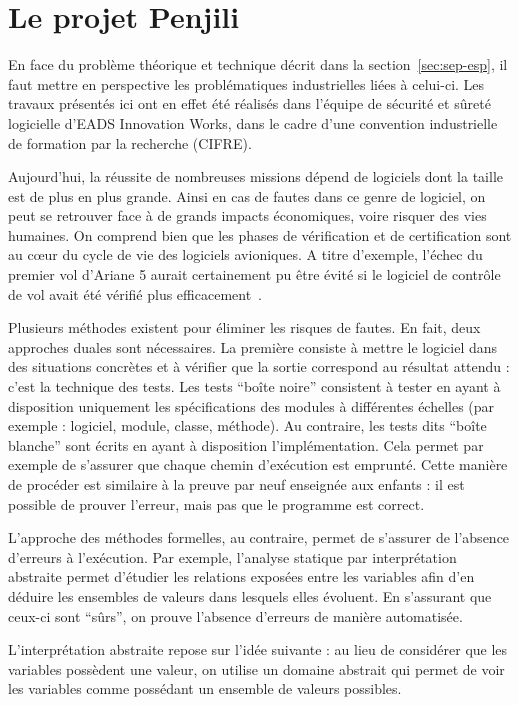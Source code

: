 \section{Le projet Penjili}

En face du problème théorique et technique décrit dans la
section~\ref{sec:sep-esp}, il faut mettre en perspective les problématiques
industrielles liées à celui-ci. Les travaux présentés ici ont en effet été
réalisés dans l'équipe de sécurité et sûreté logicielle d'EADS Innovation Works,
dans le cadre d'une convention industrielle de formation par la recherche
(CIFRE).

Aujourd'hui, la réussite de nombreuses missions dépend de logiciels dont la
taille est de plus en plus grande. Ainsi en cas de fautes dans ce genre de
logiciel, on peut se retrouver face à de grands impacts économiques, voire
risquer des vies humaines. On comprend bien que les phases de vérification et de
certification sont au cœur du cycle de vie des logiciels avioniques. A titre
d'exemple, l'échec du premier vol d'Ariane 5 aurait certainement pu être évité
si le logiciel de contrôle de vol avait été vérifié plus
efficacement~\cite{Ariane501}.

Plusieurs méthodes existent pour éliminer les risques de fautes. En fait, deux
approches duales sont nécessaires. La première consiste à mettre le logiciel
dans des situations concrètes et à vérifier que la sortie correspond au résultat
attendu : c'est la technique des tests.  Les tests \enquote{boîte noire}
consistent à tester en ayant à disposition uniquement les spécifications des
modules à différentes échelles (par exemple : logiciel, module, classe,
méthode). Au contraire, les tests dits \enquote{boîte blanche} sont écrits en
ayant à disposition l'implémentation. Cela permet par exemple de s'assurer que
chaque chemin d'exécution est emprunté. Cette manière de procéder est similaire
à la preuve par neuf enseignée aux enfants : il est possible de prouver
l'erreur, mais pas que le programme est correct.

L'approche des méthodes formelles, au contraire, permet de s'assurer de
l'absence d'erreurs à l'exécution. Par exemple, l'analyse statique par
interprétation abstraite permet d'étudier les relations exposées entre les
variables afin d'en déduire les ensembles de valeurs dans lesquels elles
évoluent. En s'assurant que ceux-ci sont \enquote{sûrs}, on prouve l'absence
d'erreurs de manière automatisée.

L'interprétation abstraite repose sur l'idée suivante : au lieu de considérer
que les variables possèdent une valeur, on utilise un domaine abstrait qui
permet de voir les variables comme possédant un ensemble de valeurs possibles.

